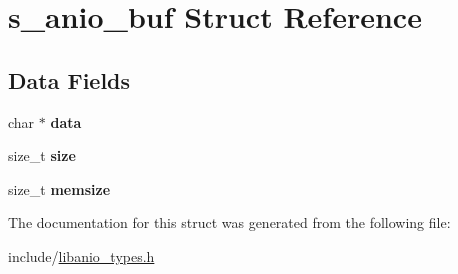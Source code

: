 \hypertarget{structs__anio__buf}{}\section{s\+\_\+anio\+\_\+buf Struct Reference}
\label{structs__anio__buf}
\subsection*{Data Fields}
\begin{DoxyCompactItemize}
\item 
\hypertarget{structs__anio__buf_a02c46784474f98b41a7e9f9c817cf90c}{}char $\ast$ {\bfseries data}\label{structs__anio__buf_a02c46784474f98b41a7e9f9c817cf90c}

\item 
\hypertarget{structs__anio__buf_ad4546e61945657a00a36b079dbf752d6}{}size\+\_\+t {\bfseries size}\label{structs__anio__buf_ad4546e61945657a00a36b079dbf752d6}

\item 
\hypertarget{structs__anio__buf_a6912d23b4ff2216e00cc8bc4665cb5c5}{}size\+\_\+t {\bfseries memsize}\label{structs__anio__buf_a6912d23b4ff2216e00cc8bc4665cb5c5}

\end{DoxyCompactItemize}


The documentation for this struct was generated from the following file\+:\begin{DoxyCompactItemize}
\item 
include/\hyperlink{libanio__types_8h}{libanio\+\_\+types.\+h}\end{DoxyCompactItemize}
